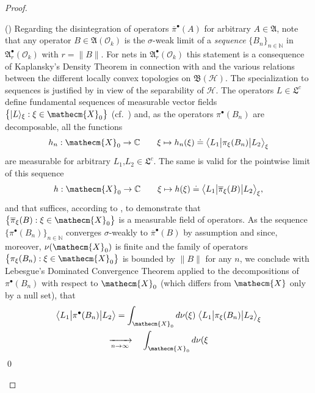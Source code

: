 \documentclass[11pt,twoside,openright]{report}
\theoremstyle{definition}
\theoremstyle{plain}
\theoremstyle{remark}
\theoremstyle{assumption}
\newcommand{\set}[1]{\{ #1 \}}
\newcommand{\bset}[1]{\bigl\{ #1 \bigr\}}
\newcommand{\norm}[1]{\lVert #1 \rVert}
\newcommand{\xiket}[1]{\vert #1 \rangle_\xi}
\newcommand{\bscpx}[3]{\bigl\langle #1 \big\vert #2 \big\vert #3
  \bigr\rangle}
\newcommand{\bxiscpx}[3]{\bigl\langle #1 \big\vert #2 \big\vert #3
  \bigr\rangle_\xi}
\newcommand{\Cbb}{\mathbb{C}}
\newcommand{\Nbb}{\mathbb{N}}
\newcommand{\Xecm}{\mathecm{X}}
\newcommand{\Afrak}{\mathfrak{A}}
\newcommand{\Hscr}{\mathscr{H}}
\newcommand{\pibar}{\overline{\pi}}
\newcommand{\BH}{\mathfrak{B} ( \mathscr{H} )}
\newcommand{\AOk}{\mathfrak{A} ( \mathscr{O}_k )}
\newcommand{\idealcount}{\mathfrak{L}^c}
\newcommand{\ArbulletOk}{\mathfrak{A}_r^\bullet ( \mathscr{O}_k )}
\newcounter{proofitem}
\newenvironment{prooflist}{\begin{list}{(\roman{proofitem})}%
  {\usecounter{proofitem} \setlength{\topsep}{0ex}%
   \setlength{\parsep}{0.2ex} \setlength{\itemsep}{0.4ex}%
   \setlength{\leftmargin}{0em} \setlength{\itemindent}{0.5em}%
   \setlength{\listparindent}{1em}}}{\qed \end{list}}
\begin{document}
\begin{proof}
\begin{prooflist}
    Regarding the disintegration of operators $\pibar^\bullet ( A )$
    for arbitrary $A \in \Afrak$, note that any operator $B \in \AOk$ is the
    $\sigma$-weak limit of a \emph{sequence} $\set{B_n}_{n \in \Nbb}$
    in $\ArbulletOk$ with $r = \norm{B}$. For nets in $\ArbulletOk$
    this statement is a consequence of Kaplansky's Density Theorem
    \cite[Theorem~II.4.8]{takesaki:1979} in connection with
    \cite[Lemma~II.2.5]{takesaki:1979} and the various relations
    between the different locally convex topologies on $\BH$. The
    specialization to sequences is justified by
    \cite[Proposition~II.2.7]{takesaki:1979} in view of the
    separability of $\Hscr$. The operators $L \in \idealcount$ define
    fundamental sequences of measurable vector fields $\bset{\xiket{L}
    : \xi \in \Xecm_0}$ (cf.~\cite[Section~II.1.3,
    Definition~1]{dixmier:1981}) and, as the operators $\pi^\bullet (
    B_n )$ are decomposable, all the functions
    \begin{equation*}
      h_n : \Xecm_0 \rightarrow \Cbb \qquad \xi \mapsto h_n ( \xi )
      \doteq \bxiscpx{L_1}{\pi_\xi ( B_n )}{L_2}
    \end{equation*}
    are measurable for arbitrary $L_1 \text{,} L_2 \in \idealcount$.
    The same is valid for the pointwise limit of this sequence
    \cite[II.1.10]{fell/doran:1988a}
    \begin{equation*}
      h : \Xecm_0 \rightarrow \Cbb \qquad \xi \mapsto h ( \xi ) \doteq
      \bxiscpx{L_1}{\pibar_\xi ( B )}{L_2} \text{,}
    \end{equation*}
    and that suffices, according to \cite[Section~II.2.1,
    Proposition~1]{dixmier:1981}, to demonstrate that
    $\bset{\pibar_\xi ( B ) : \xi \in \Xecm_0}$ is a measurable field
    of operators. As the sequence $\bset{\pi^\bullet ( B_n )}_{n \in
    \Nbb}$ converges $\sigma$-weakly to $\pibar^\bullet ( B )$ by
    assumption and since, moreover, $\nu ( \Xecm_0 )$ is finite and
    the family of operators $\bset{\pi_\xi ( B_n ) : \xi \in \Xecm_0}$
    is bounded by $\norm{B}$ for any $n$, we conclude with
    Lebesgue's Dominated Convergence Theorem applied to the
    decompositions of $\pi^\bullet ( B_n )$ with respect to $\Xecm_0$
    (which differs from $\Xecm$ only by a null set), that
    \begin{multline}
      \label{eq-local-operator-disint-limit}
      \bscpx{L_1}{\pi^\bullet ( B_n )}{L_2} = \int_{\Xecm_0} d \nu (
      \xi ) \; \bxiscpx{L_1}{\pi_\xi ( B_n )}{L_2} \\
      \xrightarrow[n \rightarrow \infty]{} \quad \int_{\Xecm_0} d \nu ( \xi

\end{multline}
\end{prooflist}
\end{proof}
\end{document}
